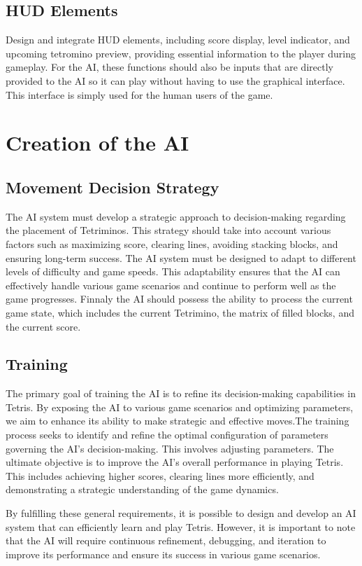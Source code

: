 \documentclass[conference]{IEEEtran}
\begin{document}
\subsection{HUD Elements}
Design and integrate HUD elements, including score display, level indicator, and upcoming tetromino preview, providing essential information to the player during gameplay. For the AI, these functions should also be inputs that are directly provided to the AI so it can play without having to use the graphical interface. This interface is simply used for the human users of the game.

\section*{Creation of the AI}
\subsection{Movement Decision Strategy}
The AI system must develop a strategic approach to decision-making regarding the placement of Tetriminos. This strategy should take into account various factors such as maximizing score, clearing lines, avoiding stacking blocks, and ensuring long-term success. The AI system must be designed to adapt to different levels of difficulty and game speeds. This adaptability ensures that the AI can effectively handle various game scenarios and continue to perform well as the game progresses. Finnaly the AI should possess the ability to process the current game state, which includes the current Tetrimino, the matrix of filled blocks, and the current score.
\subsection{Training}
The primary goal of training the AI is to refine its decision-making capabilities in Tetris. By exposing the AI to various game scenarios and optimizing parameters, we aim to enhance its ability to make strategic and effective moves.The training process seeks to identify and refine the optimal configuration of parameters governing the AI's decision-making. This involves adjusting parameters.
\newline
The ultimate objective is to improve the AI's overall performance in playing Tetris. This includes achieving higher scores, clearing lines more efficiently, and demonstrating a strategic understanding of the game dynamics.

By fulfilling these general requirements, it is possible to design and develop an AI system that can efficiently learn and play Tetris. However, it is important to note that the AI will require continuous refinement, debugging, and iteration to improve its performance and ensure its success in various game scenarios.
\end{document}
